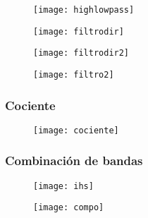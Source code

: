 \documentclass[14pt]{beamer}
\begin{document}
\begin{frame}
  \begin{figure}
    \centering
    \texttt{[image: highlowpass]}
  \end{figure}
\tiny{}
\end{frame}
\begin{frame}
  \begin{figure}
    \centering
    \texttt{[image: filtrodir]}
  \end{figure}
\tiny{}
\end{frame}
\begin{frame}
  \begin{figure}
    \centering
    \texttt{[image: filtrodir2]}
  \end{figure}
\tiny{}
\end{frame}
\begin{frame}
  \begin{figure}
    \centering
    \texttt{[image: filtro2]}
  \end{figure}
\tiny{}
\end{frame}
\begin{frame}
\frametitle{Cociente}
  \begin{figure}
    \centering
    \texttt{[image: cociente]}
  \end{figure}
\tiny{}
\end{frame}
\begin{frame}
\frametitle{Combinación de bandas}
  \begin{figure}
    \centering
    \texttt{[image: ihs]}
  \end{figure}
\tiny{}
\end{frame}
\begin{frame}
  \begin{figure}
    \centering
    \texttt{[image: compo]}
  \end{figure}
\tiny{}
\end{frame}
\end{document}
